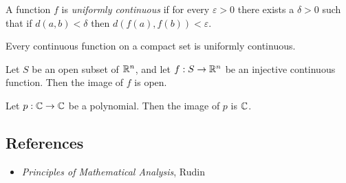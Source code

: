 \begin{defn}
  A function $f$ is \emph{uniformly continuous} if for every $\varepsilon>0$
  there exists a $\delta>0$ such that if $d(a,b)<\delta$ then
  $d(f(a),f(b))<\varepsilon$.
\end{defn}
\begin{thm}
  Every continuous function on a compact set is uniformly continuous.
\end{thm}
\begin{thm}
  Let $S$ be an open subset of $\mathbb{R}^n$, and let $f:S\to\mathbb{R}^n$ be an injective
  continuous function. Then the image of $f$ is open.
\end{thm}
\begin{thm}
  Let $p:\mathbb{C}\to\mathbb{C}$ be a polynomial. Then the image of $p$ is $\mathbb{C}$.
\end{thm}
\subsection*{References}
\begin{itemize}
  \item \emph{Principles of Mathematical Analysis}, Rudin
\end{itemize}
